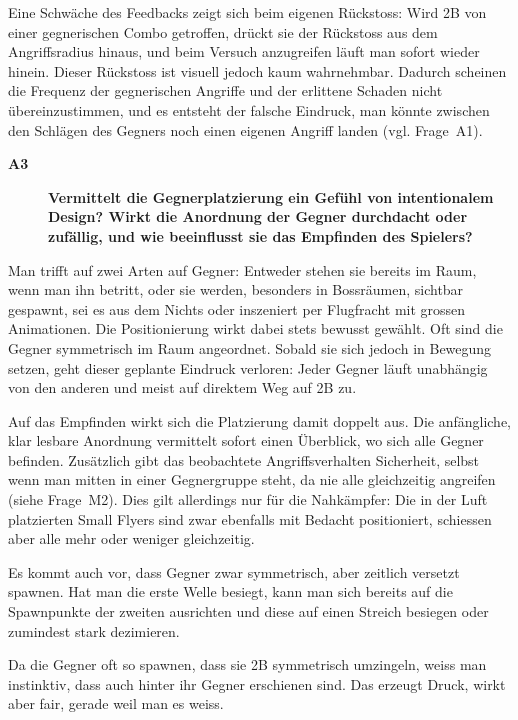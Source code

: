 \documentclass[../Main.tex]{subfiles}
\begin{document}
Eine Schwäche des Feedbacks zeigt sich beim eigenen Rückstoss: Wird 2B von einer gegnerischen Combo getroffen, drückt sie der Rückstoss aus dem Angriffsradius hinaus, und beim Versuch anzugreifen läuft man sofort wieder hinein. Dieser Rückstoss ist visuell jedoch kaum wahrnehmbar. Dadurch scheinen die Frequenz der gegnerischen Angriffe und der erlittene Schaden nicht übereinzustimmen, und es entsteht der falsche Eindruck, man könnte zwischen den Schlägen des Gegners noch einen eigenen Angriff landen (vgl. Frage~A1).

\begin{description}
    \item[\textbf{A3}] \textbf{Vermittelt die Gegnerplatzierung ein Gefühl von intentionalem Design? Wirkt die Anordnung der Gegner durchdacht oder zufällig, und wie beeinflusst sie das Empfinden des Spielers?}
\end{description}

Man trifft auf zwei Arten auf Gegner: Entweder stehen sie bereits im Raum, wenn man ihn betritt, oder sie werden, besonders in Bossräumen, sichtbar gespawnt, sei es aus dem Nichts oder inszeniert per Flugfracht mit grossen Animationen. Die Positionierung wirkt dabei stets bewusst gewählt. Oft sind die Gegner symmetrisch im Raum angeordnet. Sobald sie sich jedoch in Bewegung setzen, geht dieser geplante Eindruck verloren: Jeder Gegner läuft unabhängig von den anderen und meist auf direktem Weg auf 2B zu.

Auf das Empfinden wirkt sich die Platzierung damit doppelt aus. Die anfängliche, klar lesbare Anordnung vermittelt sofort einen Überblick, wo sich alle Gegner befinden. Zusätzlich gibt das beobachtete Angriffsverhalten Sicherheit, selbst wenn man mitten in einer Gegnergruppe steht, da nie alle gleichzeitig angreifen (siehe Frage~M2). Dies gilt allerdings nur für die Nahkämpfer: Die in der Luft platzierten Small Flyers sind zwar ebenfalls mit Bedacht positioniert, schiessen aber alle mehr oder weniger gleichzeitig.

Es kommt auch vor, dass Gegner zwar symmetrisch, aber zeitlich versetzt spawnen. Hat man die erste Welle besiegt, kann man sich bereits auf die Spawnpunkte der zweiten ausrichten und diese auf einen Streich besiegen oder zumindest stark dezimieren.

Da die Gegner oft so spawnen, dass sie 2B symmetrisch umzingeln, weiss man instinktiv, dass auch hinter ihr Gegner erschienen sind. Das erzeugt Druck, wirkt aber fair, gerade weil man es weiss.
\end{document}
